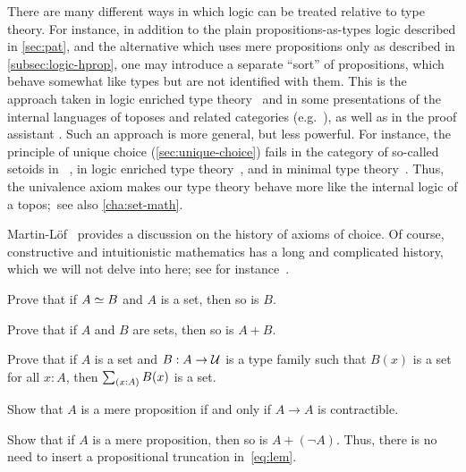 There are many different ways in which logic can be treated relative to type theory.
For instance, in addition to the plain propositions-as-types logic described in \autoref{sec:pat}, and the alternative which uses mere propositions only as described in \autoref{subsec:logic-hprop}, one may introduce a separate ``sort'' of propositions, which behave somewhat like types but are not identified with them.
This is the approach taken in logic enriched type theory~\cite{aczel2002collection} and in some presentations of the internal languages of toposes and related categories (e.g.~\cite{jacobs1999categorical,elephant}), as well as in the proof assistant \Coq.
Such an approach is more general, but less powerful.
For instance, the principle of unique choice (\autoref{sec:unique-choice}) fails in the category of so-called setoids in \Coq~\cite{Spiwack}, in logic enriched type theory~\cite{aczel2002collection}, and in minimal type theory~\cite{maietti2005toward}.
Thus, the univalence axiom makes our type theory behave more like the internal logic of a topos;~see also \autoref{cha:set-math}.

Martin-L\"of~\cite{martin2006100} provides a discussion on the history of axioms of choice.
Of course, constructive and intuitionistic mathematics has a long and complicated history, which we will not delve into here; see for instance~\cite{TroelstraI,TroelstraII}.

\sectionExercises

\begin{ex}
  Prove that if $A \simeq B$ and $A$ is a set, then so is $B$.
\end{ex}

\begin{ex}\label{ex:isset-coprod}
  Prove that if $A$ and $B$ are sets, then so is $A+B$.
\end{ex}

\begin{ex}\label{ex:isset-sigma}
  Prove that if $A$ is a set and $B:A\to \mathcal{U}$ is a type family such that $B(x)$ is a set for all $x:A$, then $\sm{x:A} B(x)$ is a set.
\end{ex}

\begin{ex}\label{ex:prop-endocontr}
  Show that $A$ is a mere proposition if and only if $A\to A$ is contractible.
\end{ex}

\begin{ex}\label{ex:lem-mereprop}
  Show that if $A$ is a mere proposition, then so is $A+(\neg A)$.
  Thus, there is no need to insert a propositional truncation in~\eqref{eq:lem}.
\end{ex}

